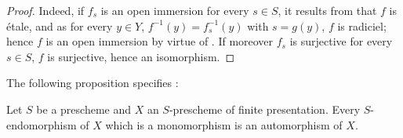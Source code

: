 \begin{proof}
Indeed, if $f_s$ is an open immersion for every $s\in S$, it results from  that $f$ is \'etale, and as for every $y\in Y$, $f^{-1}(y)=f_s^{-1}(y)$ with $s=g(y)$, $f$ is radiciel; hence $f$ is an open immersion by virtue of .
If moreover $f_s$ is surjective for every $s\in S$, $f$ is surjective, hence an isomorphism.
\end{proof}

The following proposition specifies :
\begin{proposition}[17.9.6]
\label{IV.17.9.6}
Let $S$ be a prescheme and $X$ an $S$-prescheme of finite presentation.
Every $S$-endomorphism of $X$ which is a monomorphism is an automorphism of $X$.
\end{proposition}

